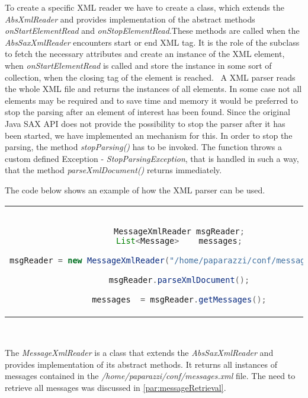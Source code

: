 To create a specific XML reader we have to create a class, which extends the \textit{AbsXmlReader} and provides implementation of the abstract methods \textit{onStartElementRead} and \textit{onStopElementRead}.These methods are called when the \textit{AbsSaxXmlReader} encounters start or end XML tag. It is the role of the subclass to fetch the necessary attributes and create an instance of the XML element, when \textit{onStartElementRead} is called and store the instance in some sort of collection, when the closing tag of the element is reached. \
A XML parser reads the whole XML file and returns the instances of all elements. In some case not all elements may be required and to save time and memory it would be preferred to stop the parsing after an element of interest has been found. Since the original Java SAX API does not provide the possibility to stop the parser after it has been started, we have implemented an mechanism for this.
In order to stop the parsing, the method \textit{stopParsing()} has to be invoked. The function throws a custom defined Exception - \textit{StopParsingException}, that is handled in such a way, that the method \textit{parseXmlDocument()} returns immediately.

The code below shows an example of how the XML parser can be used.

\begin{center}
\begin{tabular}{c}
\begin{lstlisting}[basicstyle=\small, language=Java]

MessageXmlReader msgReader;
List<Message>    messages;

msgReader = new MessageXmlReader("/home/paparazzi/conf/messages.xml");

msgReader.parseXmlDocument();

messages  = msgReader.getMessages();

\end{lstlisting}
\end{tabular}
\end{center}

\

The \textit{MessageXmlReader} is a class that extends the \textit{AbsSaxXmlReader} and provides implementation of its abstract methods. It returns all instances of messages contained in the \textit{/home/paparazzi/conf/messages.xml} file. The need to retrieve all messages was discussed 
in \ref{par:messageRetrieval}. \




